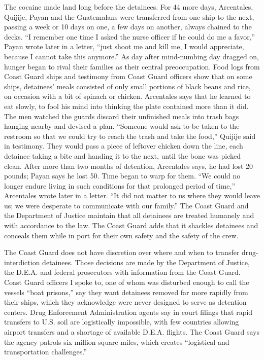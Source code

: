 The cocaine made land long before the detainees. For 44 more days,
Arcentales, Quijije, Payan and the Guatemalans were transferred from one
ship to the next, passing a week or 10 days on one, a few days on
another, always chained to the decks. ``I remember one time I asked the
nurse officer if he could do me a favor,'' Payan wrote later in a
letter, ``just shoot me and kill me, I would appreciate, because I
cannot take this anymore.'' As day after mind-numbing day dragged on,
hunger began to rival their families as their central preoccupation.
Food logs from Coast Guard ships and testimony from Coast Guard officers
show that on some ships, detainees' meals consisted of only small
portions of black beans and rice, on occasion with a bit of spinach or
chicken. Arcentales says that he learned to eat slowly, to fool his mind
into thinking the plate contained more than it did. The men watched the
guards discard their unfinished meals into trash bags hanging nearby and
devised a plan. ``Someone would ask to be taken to the restroom so that
we could try to reach the trash and take the food,'' Quijije said in
testimony. They would pass a piece of leftover chicken down the line,
each detainee taking a bite and handing it to the next, until the bone
was picked clean. After more than two months of detention, Arcentales
says, he had lost 20 pounds; Payan says he lost 50. Time began to warp
for them. ``We could no longer endure living in such conditions for that
prolonged period of time,'' Arcentales wrote later in a letter. ``It did
not matter to us where they would leave us; we were desperate to
communicate with our family.'' The Coast Guard and the Department of
Justice maintain that all detainees are treated humanely and with
accordance to the law. The Coast Guard adds that it shackles detainees
and conceals them while in port for their own safety and the safety of
the crew.

The Coast Guard does not have discretion over where and when to transfer
drug-interdiction detainees. Those decisions are made by the Department
of Justice, the D.E.A. and federal prosecutors with information from the
Coast Guard. Coast Guard officers I spoke to, one of whom was disturbed
enough to call the vessels ``boat prisons,'' say they want detainees
removed far more rapidly from their ships, which they acknowledge were
never designed to serve as detention centers. Drug Enforcement
Administration agents say in court filings that rapid transfers to U.S.
soil are logistically impossible, with few countries allowing airport
transfers and a shortage of available D.E.A. flights. The Coast Guard
says the agency patrols six million square miles, which creates
``logistical and transportation challenges.''

